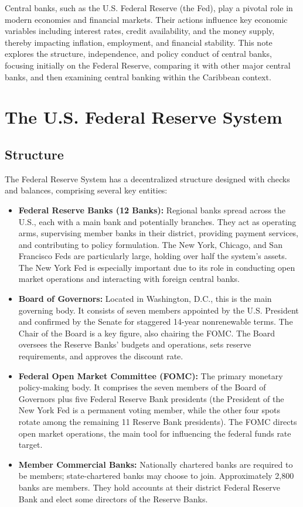 \newpage 



Central banks, such as the U.S. Federal Reserve (the Fed), play a pivotal role in modern economies and financial markets. Their actions influence key economic variables including interest rates, credit availability, and the money supply, thereby impacting inflation, employment, and financial stability. This note explores the structure, independence, and policy conduct of central banks, focusing initially on the Federal Reserve, comparing it with other major central banks, and then examining central banking within the Caribbean context.

\section{The U.S. Federal Reserve System}

\subsection{Structure}
The Federal Reserve System has a decentralized structure designed with checks and balances, comprising several key entities:
\begin{itemize}
    \item \textbf{Federal Reserve Banks (12 Banks):} Regional banks spread across the U.S., each with a main bank and potentially branches. They act as operating arms, supervising member banks in their district, providing payment services, and contributing to policy formulation. The New York, Chicago, and San Francisco Feds are particularly large, holding over half the system's assets. The New York Fed is especially important due to its role in conducting open market operations and interacting with foreign central banks.
    \item \textbf{Board of Governors:} Located in Washington, D.C., this is the main governing body. It consists of seven members appointed by the U.S. President and confirmed by the Senate for staggered 14-year nonrenewable terms. The Chair of the Board is a key figure, also chairing the FOMC. The Board oversees the Reserve Banks' budgets and operations, sets reserve requirements, and approves the discount rate.
    \item \textbf{Federal Open Market Committee (FOMC):} The primary monetary policy-making body. It comprises the seven members of the Board of Governors plus five Federal Reserve Bank presidents (the President of the New York Fed is a permanent voting member, while the other four spots rotate among the remaining 11 Reserve Bank presidents). The FOMC directs open market operations, the main tool for influencing the federal funds rate target.
    \item \textbf{Member Commercial Banks:} Nationally chartered banks are required to be members; state-chartered banks may choose to join. Approximately 2,800 banks are members. They hold accounts at their district Federal Reserve Bank and elect some directors of the Reserve Banks.
\end{itemize}

